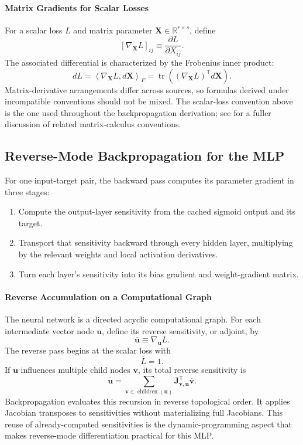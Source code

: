 \documentclass{article}
\begin{document}
\paragraph{Matrix Gradients for Scalar Losses}
For a scalar loss \(L\) and matrix parameter
\(\mathbf{X}\in\mathbb{R}^{r\times s}\), define
\[
  \left[\nabla_{\mathbf{X}}L\right]_{ij}
  \equiv
  \frac{\partial L}{\partial X_{ij}}.
\]
The associated differential is characterized by the Frobenius inner
product:
\[
  \boxed{
    dL
    =
    \left\langle\nabla_{\mathbf{X}}L,d\mathbf{X}\right\rangle_F
    =
    \operatorname{tr}
    \left(
      (\nabla_{\mathbf{X}}L)^\mathsf{T}d\mathbf{X}
    \right).
  }
\]
Matrix-derivative arrangements differ across sources, so formulas
derived under incompatible conventions should not be mixed. The
scalar-loss convention above is the one used throughout the
backpropagation derivation; see \cite{golden2020} for a fuller discussion of related
matrix-calculus conventions.

\subsection{Reverse-Mode Backpropagation for the MLP}

For one input-target pair, the backward pass computes its parameter
gradient in three stages:
\begin{enumerate}
  \item Compute the output-layer sensitivity from the cached sigmoid
  output and its target.
  \item Transport that sensitivity backward through every hidden layer,
  multiplying by the relevant weights and local activation derivatives.
  \item Turn each layer's sensitivity into its bias gradient and
  weight-gradient matrix.
\end{enumerate}

\paragraph{Reverse Accumulation on a Computational Graph}
The neural network is a directed acyclic computational graph. For each
intermediate vector node \(\mathbf{u}\), define its reverse sensitivity,
or adjoint, by
\[
  \overline{\mathbf{u}}
  \equiv
  \nabla_{\mathbf{u}}L.
\]
The reverse pass begins at the scalar loss with
\[
  \overline{L}=1.
\]
If \(\mathbf{u}\) influences multiple child nodes \(\mathbf{v}\), its
total reverse sensitivity is
\[
  \boxed{
    \overline{\mathbf{u}}
    =
    \sum_{\mathbf{v}\in\operatorname{children}(\mathbf{u})}
    \mathbf{J}_{\mathbf{v},\mathbf{u}}^\mathsf{T}
    \overline{\mathbf{v}}.
  }
\]
Backpropagation evaluates this recursion in reverse topological order.
It applies Jacobian transposes to sensitivities without materializing
full Jacobians. This reuse of already-computed sensitivities is the
dynamic-programming aspect that makes reverse-mode differentiation
practical for this MLP.
\end{document}
